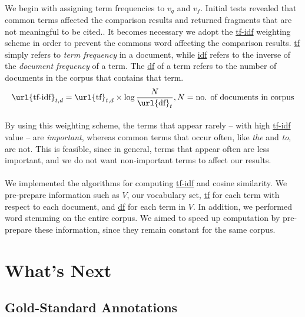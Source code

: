 \documentclass[12 pt]{article}
\begin{document}
\paragraph{}
We begin with assigning term frequencies to $v_q$ and $v_f$. Initial tests revealed that common terms affected the comparison results and returned fragments that are not meaningful to be cited.. It becomes necessary we adopt the \url{tf-idf} weighting scheme in order to prevent the commons word affecting the comparison results. \url{tf} simply refers to \textit{term frequency} in a document, while \url{idf} refers to the inverse of the \textit{document frequency} of a term. The \url{df} of a term refers to the number of documents in the corpus that contains that term.
\begin{equation}
\text{\url{tf-idf}}_{t,d} = \text{\url{tf}}_{t,d} \times \log{\frac{N}{\text{\url{df}}_t}}, N=\text{no. of documents in corpus}
\end{equation}
\paragraph{}
By using this weighting scheme, the terms that appear rarely -- with high \url{tf-idf} value -- are \textit{important}, whereas common terms that occur often, like \textit{the} and \textit{to}, are not. This is feasible, since in general, terms that appear often are less important, and we do not want non-important terms to affect our results.

\paragraph{}
We implemented the algorithms for computing \url{tf-idf} and cosine similarity. We pre-prepare information such as $V$, our vocabulary set, \url{tf} for each term with respect to each document, and \url{df} for each term in $V$. In addition, we performed word stemming on the entire corpus. We aimed to speed up computation by pre-prepare these information, since they remain constant for the same corpus.

\section{What's Next}
\label{whatsnext}
\subsection{Gold-Standard Annotations}
\end{document}
